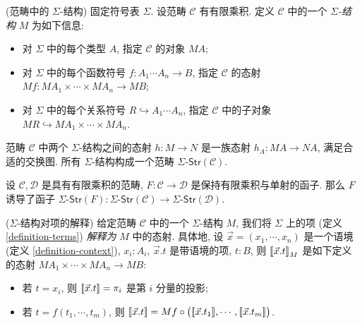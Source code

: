 \begin{definition}
	[label={sigma-structures-in-category}]
	{(范畴中的 $\Sigma$-结构)}
	固定符号表 $\Sigma$. 设范畴 $\mathcal C$ 有有限乘积.
	定义 $\mathcal C$ 中的一个 \emph{$\Sigma$-结构} $M$ 为如下信息:
	\begin{itemize}
		\item 对 $\Sigma$ 中的每个类型 $A$, 指定 $\mathcal C$ 的对象 $MA$;
		\item 对 $\Sigma$ 中的每个函数符号 $f\colon A_1\cdots A_n \to B$, 指定 $\mathcal C$ 的态射
		$Mf \colon MA_1\times\cdots\times MA_n \to MB$;
		\item 对 $\Sigma$ 中的每个关系符号 $R \hookrightarrow A_1\cdots A_n$, 指定 $\mathcal C$ 中的子对象
		$MR \hookrightarrow MA_1\times\cdots\times MA_n$.
	\end{itemize}
	
	范畴 $\mathcal C$ 中两个 $\Sigma$-结构之间的态射 $h\colon M\to N$ 是一族态射 $h_A \colon MA \to NA$, 满足合适的交换图. 所有 $\Sigma$-结构构成一个范畴 $\Sigma\text{-}\mathsf{Str}(\mathcal C)$.
	
\end{definition}

\begin{prop}
	{}
	设 $\mathcal C,\mathcal D$ 是具有有限乘积的范畴,
	$F \colon \mathcal C \to \mathcal D$ 是保持有限乘积与单射的函子. 那么 $F$ 诱导了函子
	$\Sigma\text{-}\mathsf{Str}(F)\colon \Sigma\text{-}\mathsf{Str}(\mathcal C) \to \Sigma\text{-}\mathsf{Str}(\mathcal D)$.
\end{prop}


\begin{definition}
	[label={term-interpretation}]
	{($\Sigma$-结构对项的解释)}
	给定范畴 $\mathcal C$ 中的一个 $\Sigma$-结构 $M$, 我们将 $\Sigma$ 上的项 (定义 \ref{definition-terms}) \emph{解释为} $M$ 中的态射.
	具体地, 设 $\vec x = (x_1,\cdots,x_n)$ 是一个语境 (定义 \ref{definition-context}), $x_i\colon A_i$,
	$\vec x.t$ 是带语境的项, $t\colon B$, 则 ${[\![\vec x.t]\!]}_M$ 是如下定义的态射 $MA_1\times\cdots\times MA_n\to MB$:
	\begin{itemize}
		\item 若 $t=x_i$, 则 ${[\![\vec x.t]\!]} = \pi_i$ 是第 $i$ 分量的投影;
		\item 若 $t = f(t_1,\cdots,t_m)$, 则
		${[\![\vec x.t]\!]} = Mf \circ \big({[\![\vec x.t_1]\!]},\cdots,{[\![\vec x.t_m]\!]}\big)$.
	\end{itemize}
\end{definition}

